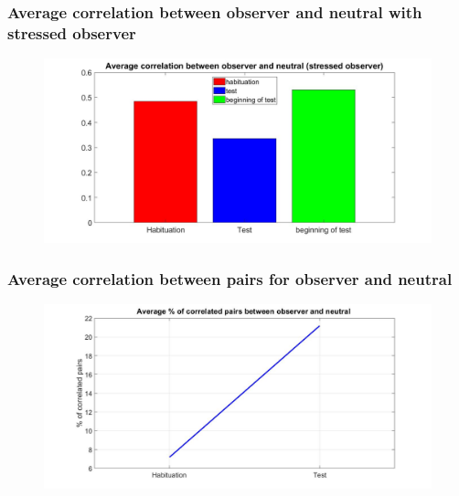 \documentclass{beamer}
\begin{document}
\begin{frame}
\frametitle{ Average correlation between observer and neutral with stressed observer}



\begin{figure}[H]
	\begin{center}
		\hspace*{-1.7cm}
		\includegraphics[scale=.32]{avg_corr_neut2.jpg} 
	\end{center}  
	
	
\end{figure}

\end{frame}


\begin{frame}
\frametitle{ Average correlation between pairs for observer and neutral}



\begin{figure}[H]
	\begin{center}
		\hspace*{-1.7cm}
		\includegraphics[scale=.32]{perc_neut.jpg} 
	\end{center}  
	
	
\end{figure}

\end{frame}
\end{document}
